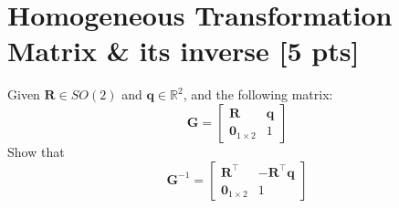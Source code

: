 \section{ Homogeneous Transformation Matrix \& its inverse [5 pts]}
Given $\mathbf{R}\in SO(2)$ and $\mathbf{q}\in\mathbb{R}^2$, and the following matrix:
\begin{equation*}
    \mathbf{G}=\begin{bmatrix}
        \mathbf{R} & \mathbf{q}\\ \mathbf{0}_{1\times2} & 1
    \end{bmatrix}
\end{equation*}
Show that 
\begin{equation*}
\mathbf{G}^{-1}=\begin{bmatrix}
        \mathbf{R}^\top & -\mathbf{R}^\top\mathbf{q}\\ \mathbf{0}_{1\times2} & 1
    \end{bmatrix}
\end{equation*}